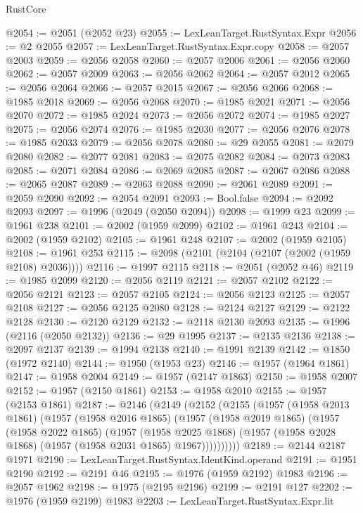 \begin{lexlean}{RustCore}
\begin{coremodule}
@2054 := @2051 (@2052 @23)
@2055 := LexLeanTarget.RustSyntax.Expr
@2056 := @2 @2055
@2057 := LexLeanTarget.RustSyntax.Expr.copy
@2058 := @2057 @2003
@2059 := @2056 @2058
@2060 := @2057 @2006
@2061 := @2056 @2060
@2062 := @2057 @2009
@2063 := @2056 @2062
@2064 := @2057 @2012
@2065 := @2056 @2064
@2066 := @2057 @2015
@2067 := @2056 @2066
@2068 := @1985 @2018
@2069 := @2056 @2068
@2070 := @1985 @2021
@2071 := @2056 @2070
@2072 := @1985 @2024
@2073 := @2056 @2072
@2074 := @1985 @2027
@2075 := @2056 @2074
@2076 := @1985 @2030
@2077 := @2056 @2076
@2078 := @1985 @2033
@2079 := @2056 @2078
@2080 := @29 @2055
@2081 := @2079 @2080
@2082 := @2077 @2081
@2083 := @2075 @2082
@2084 := @2073 @2083
@2085 := @2071 @2084
@2086 := @2069 @2085
@2087 := @2067 @2086
@2088 := @2065 @2087
@2089 := @2063 @2088
@2090 := @2061 @2089
@2091 := @2059 @2090
@2092 := @2054 @2091
@2093 := Bool.false
@2094 := @2092 @2093
@2097 := @1996 (@2049 (@2050 @2094))
@2098 := @1999 @23
@2099 := @1961 @238
@2101 := @2002 (@1959 @2099)
@2102 := @1961 @243
@2104 := @2002 (@1959 @2102)
@2105 := @1961 @248
@2107 := @2002 (@1959 @2105)
@2108 := @1961 @253
@2115 := @2098 (@2101 (@2104 (@2107 (@2002 (@1959 @2108) @2036))))
@2116 := @1997 @2115
@2118 := @2051 (@2052 @46)
@2119 := @1985 @2099
@2120 := @2056 @2119
@2121 := @2057 @2102
@2122 := @2056 @2121
@2123 := @2057 @2105
@2124 := @2056 @2123
@2125 := @2057 @2108
@2127 := @2056 @2125 @2080
@2128 := @2124 @2127
@2129 := @2122 @2128
@2130 := @2120 @2129
@2132 := @2118 @2130 @2093
@2135 := @1996 (@2116 (@2050 @2132))
@2136 := @29 @1995
@2137 := @2135 @2136
@2138 := @2097 @2137
@2139 := @1994 @2138
@2140 := @1991 @2139
@2142 := @1850 (@1972 @2140)
@2144 := @1950 (@1953 @23)
@2146 := @1957 (@1964 @1861)
@2147 := @1958 @2004
@2149 := @1957 (@2147 @1863)
@2150 := @1958 @2007
@2152 := @1957 (@2150 @1861)
@2153 := @1958 @2010
@2155 := @1957 (@2153 @1861)
@2187 := @2146
    (@2149
      (@2152
        (@2155
          (@1957
            (@1958 @2013 @1861)
            (@1957
              (@1958 @2016 @1865)
              (@1957
                (@1958 @2019 @1865)
                (@1957
                  (@1958 @2022 @1865)
                  (@1957
                    (@1958 @2025 @1868)
                    (@1957 (@1958 @2028 @1868) (@1957 (@1958 @2031 @1865) @1967))))))))))
@2189 := @2144 @2187 @1971
@2190 := LexLeanTarget.RustSyntax.IdentKind.operand
@2191 := @1951 @2190
@2192 := @2191 @46
@2195 := @1976 (@1959 @2192) @1983
@2196 := @2057 @1962
@2198 := @1975 (@2195 @2196)
@2199 := @2191 @127
@2202 := @1976 (@1959 @2199) @1983
@2203 := LexLeanTarget.RustSyntax.Expr.lit

\end{coremodule}
\end{lexlean}
